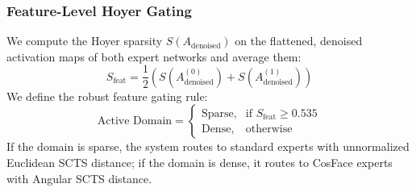 \documentclass{article}
\theoremstyle{plain}
\theoremstyle{definition}
\theoremstyle{remark}
\begin{document}
\subsubsection{Feature-Level Hoyer Gating}
We compute the Hoyer sparsity $S(A_{\text{denoised}})$ on the flattened, denoised activation maps of both expert networks and average them:
\begin{equation}
  S_{\text{feat}} = \frac{1}{2} \left( S(A^{(0)}_{\text{denoised}}) + S(A^{(1)}_{\text{denoised}}) \right)
\end{equation}
We define the robust feature gating rule:
\begin{equation}
  \text{Active Domain} = \begin{cases} \text{Sparse}, & \text{if } S_{\text{feat}} \ge 0.535 \\ \text{Dense}, & \text{otherwise} \end{cases}
\end{equation}
If the domain is sparse, the system routes to standard experts with unnormalized Euclidean SCTS distance; if the domain is dense, it routes to CosFace experts with Angular SCTS distance.
\end{document}

